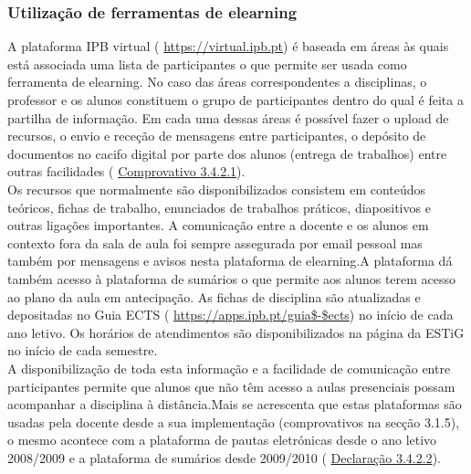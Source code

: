 \documentclass[11pt]{article}
\begin{document}
\subsubsection{Utilização de ferramentas de elearning}A plataforma IPB virtual (
\url{https://virtual.ipb.pt}) é baseada em áreas às quais está associada uma lista de participantes o que permite ser usada como ferramenta de elearning. No caso das áreas correspondentes a disciplinas, o professor e os alunos constituem o grupo de participantes dentro do qual é feita a partilha de informação. Em cada uma dessas áreas é possível fazer o upload de recursos, o envio e receção de mensagens entre participantes, o depósito de documentos no cacifo digital por parte dos alunos (entrega de trabalhos) entre outras facilidades (
\href{run:Virtual/mensagensvirtual.pdf}{Comprovativo 3.4.2.1}). \\
Os recursos que normalmente são disponibilizados consistem em conteúdos teóricos, fichas de trabalho, enunciados de trabalhos práticos, diapositivos e outras ligações importantes. A comunicação entre a docente e os alunos em contexto fora da sala de aula foi sempre assegurada por email pessoal mas também por mensagens e avisos nesta plataforma de elearning.A plataforma dá também acesso à plataforma de sumários o que permite aos alunos terem acesso ao plano da aula em antecipação. As fichas de disciplina são atualizadas e depositadas no Guia ECTS (
\url{https://apps.ipb.pt/guia$-$ects}) no início de cada ano letivo. Os horários de atendimentos são disponibilizados na página da ESTiG no início de cada semestre. \\
A disponibilização de toda esta informação e a facilidade de comunicação entre participantes permite que alunos que não têm acesso a aulas presenciais possam acompanhar a disciplina à distância.Mais se acrescenta que estas plataformas são usadas pela docente desde a sua implementação (comprovativos na secção 3.1.5), o mesmo acontece com a plataforma de pautas eletrónicas desde o ano letivo 2008/2009 e a plataforma de sumários desde 2009/2010  (
\href{run:Virtual/pautassumarios.pdf}{Declaração 3.4.2.2}).
\end{document}

